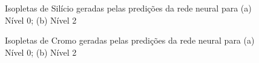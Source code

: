 \documentclass[brazil,tf,epusp]{usp}  %
\begin{document}
\begin{figure}
\caption{Isopletas de Silício geradas pelas predições da rede neural para (a) Nível 0; (b) Nível 2 }
\label{fig:Si_NN_isop}
\end{figure}

\begin{figure}
\caption{Isopletas de Cromo geradas pelas predições da rede neural para (a) Nível 0; (b) Nível 2 }
\label{fig:Cr_NN_isop}
\end{figure}
\end{document}
